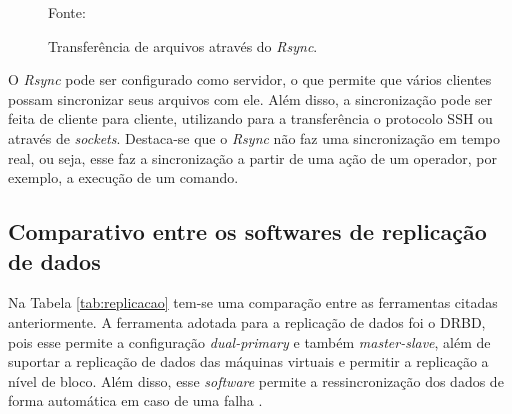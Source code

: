 \begin{figure}[h!]
 \centering
 \caption{Transferência de arquivos através do \textit{Rsync}.}
 Fonte: \citet{lopez2012}
 \label{fig:rsync}
\end{figure}


O \textit{Rsync} pode ser configurado como servidor, o que permite que vários clientes possam sincronizar seus arquivos com ele. 
Além disso, a sincronização pode ser feita de cliente para cliente, utilizando para a transferência o protocolo \ac{SSH} ou através de 
\textit{sockets}. Destaca-se que o \textit{Rsync} não faz uma sincronização em tempo real, ou seja, esse faz a sincronização a partir de 
uma ação de um operador, por exemplo, a execução de um comando.


\newpage
\subsection{Comparativo entre os softwares de replicação de dados}
\label{section:replicacaoescolhido}

Na Tabela \ref{tab:replicacao} tem-se uma comparação entre as ferramentas citadas anteriormente. A ferramenta adotada para a replicação 
de dados foi o \ac{DRBD}, pois esse permite a configuração \textit{dual-primary} e também \textit{master-slave}, além de suportar a replicação 
de dados das máquinas virtuais e permitir a replicação a nível de bloco. Além disso, esse \textit{software} permite a ressincronização dos dados 
de forma automática em caso de uma falha \cite{drbd}.

